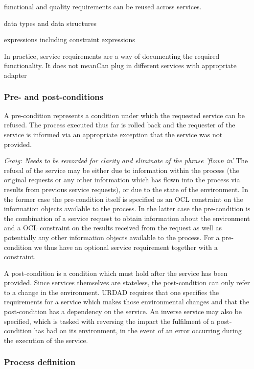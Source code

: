 functional and quality requirements can be reused across services. 

data types and data structures

expressions including constraint expressions

 In practice, service requirements are a way of documenting the required functionality. It does not meanCan plug in different services with appropriate adapter


\subsubsection{Pre- and post-conditions}

A pre-condition represents a condition under which the requested service can be refused. The process executed thus far is rolled back and the requester of the service is informed via an appropriate exception that the service was not provided. 

{\em Craig: Needs to be reworded for clarity and eliminate of the phrase 'flown in'}
The refusal of the service may be either due to information within the process (the original requests or any other information which has flown into the process via results from previous service requests), or due to the state of the environment. In the former case the pre-condition itself is specified as an OCL constraint on the information objects available to the process. In the latter case the pre-condition is the combination of a service request to obtain information about the environment and a OCL constraint on the results received from the request as well as potentially any other information objects available to the process. For a pre-condition we thus have an optional service requirement together with a constraint.

A post-condition is a condition which must hold after the service has been provided. Since services themselves are stateless, the post-condition can only refer to a change in the environment. URDAD requires that one specifies the requirements for a service which makes those environmental changes and that the post-condition has a dependency on the service. An inverse service may also be specified, which is tasked with reversing the impact the fulfilment of a post-condition has had on its environment, in the event of an error occurring during the execution of the service.

\subsubsection{Process definition}

